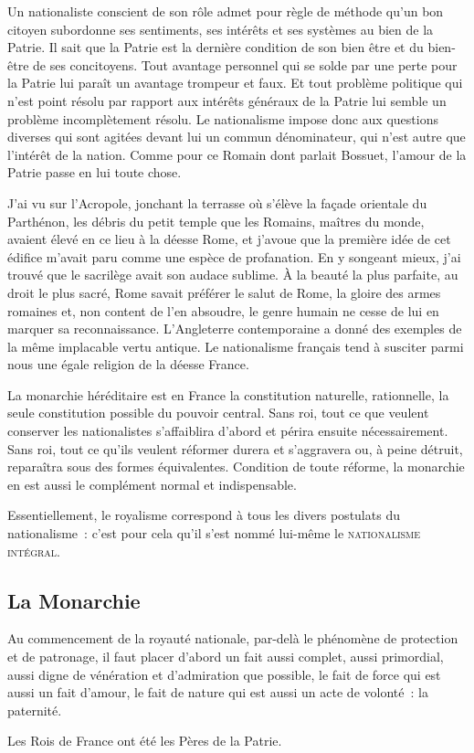 \documentclass[french,twoside]{book} %
\newcommand{\astermono}{\medskip\centerline{\color{rubric}\large\selectfont{\syms ✻}}\medskip\par}%
\begin{document}
\astermono

\noindent Un nationaliste conscient de son rôle admet pour règle de méthode qu’un bon citoyen subordonne ses sentiments, ses intérêts et ses systèmes au bien de la Patrie. Il sait que la Patrie est la dernière condition de son bien être et du bien-être de ses concitoyens. Tout avantage personnel qui se solde par une perte pour la Patrie lui paraît un avantage trompeur et faux. Et tout problème politique qui n’est point résolu par rapport aux intérêts généraux de la Patrie lui semble un problème incomplètement résolu. Le nationalisme impose donc aux questions diverses qui sont agitées devant lui un commun dénominateur, qui n’est autre que l’intérêt de la nation. Comme pour ce Romain dont parlait Bossuet, l’amour de la Patrie passe en lui toute chose.\par
J’ai vu sur l’Acropole, jonchant la terrasse où s’élève la façade orientale du Parthénon, les débris du petit temple que les Romains, maîtres du monde, avaient élevé en ce lieu à la déesse Rome, et j’avoue que la première idée de cet édifice m’avait paru comme une espèce de profanation. En y songeant mieux, j’ai trouvé que le sacrilège avait son audace sublime. À la beauté la plus parfaite, au droit le plus sacré, Rome savait préférer le salut de Rome, la gloire des armes romaines et, non content de l’en absoudre, le genre humain ne cesse de lui en marquer sa reconnaissance. L’Angleterre contemporaine a donné des exemples de la même implacable vertu antique. Le nationalisme français tend à susciter parmi nous une égale religion de la déesse France.\par
La monarchie héréditaire est en France la constitution naturelle, rationnelle, la seule constitution possible du pouvoir central. Sans roi, tout ce que veulent conserver les nationalistes s’affaiblira d’abord et périra ensuite nécessairement. Sans roi, tout ce qu’ils veulent réformer durera et s’aggravera ou, à peine détruit, reparaîtra sous des formes équivalentes. Condition de toute réforme, la monarchie en est aussi le complément normal et indispensable.\par
Essentiellement, le royalisme correspond à tous les divers postulats du nationalisme : c’est pour cela qu’il s’est nommé lui-même le {\scshape nationalisme intégral}.\par

\astermono

\subsection[{La Monarchie}]{La Monarchie}
\noindent Au commencement de la royauté nationale, par-delà le phénomène de protection et de patronage, il faut placer d’abord un fait aussi complet, aussi primordial, aussi digne de vénération et d’admiration que possible, le fait de force qui est aussi un fait d’amour, le fait de nature qui est aussi un acte de volonté : la paternité.\par
Les Rois de France ont été les Pères de la Patrie.\par
\end{document}
